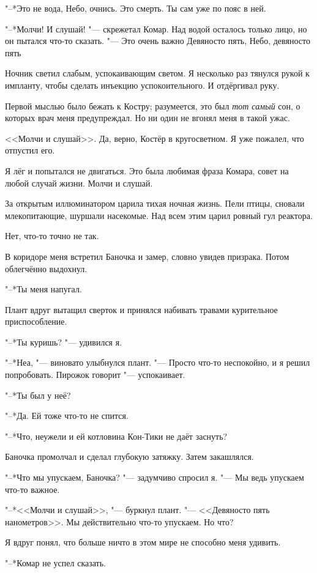 "--*Это не вода, Небо, очнись.
Это смерть.
Ты сам уже по пояс в ней.

"--*Молчи! И слушай! "--- скрежетал Комар.
Над водой осталось только лицо, но он пытался что-то сказать.
"--- Это очень важно\ldotst
Девяносто пять, Небо, девяносто пять\ldotst

\razd

Ночник светил слабым, успокаивающим светом.
Я несколько раз тянулся рукой к импланту, чтобы сделать инъекцию успокоительного.
И отдёргивал руку.

Первой мыслью было бежать к Костру;
разумеется, это был \emph{тот самый} сон, о которых врач меня предупреждал.
Но ни один не вгонял меня в такой ужас.

<<Молчи и слушай>>.
Да, верно, Костёр в кругосветном.
Я уже пожалел, что отпустил его.

Я лёг и попытался не двигаться.
Это была любимая фраза Комара, совет на любой случай жизни.
Молчи и слушай.

За открытым иллюминатором царила тихая ночная жизнь.
Пели птицы, сновали млекопитающие, шуршали насекомые.
Над всем этим царил ровный гул реактора.

Нет, что-то точно не так.

В коридоре меня встретил Баночка и замер, словно увидев призрака.
Потом облегчённо выдохнул.

"--*Ты меня напугал.

Плант вдруг вытащил сверток и принялся набивать травами курительное приспособление.

"--*Ты куришь? "--- удивился я.

"--*Неа, "--- виновато улыбнулся плант.
"--- Просто что-то неспокойно, и я решил попробовать.
Пирожок говорит "--- успокаивает.

"--*Ты был у неё?

"--*Да.
Ей тоже что-то не спится.

"--*Что, неужели и ей котловина Кон-Тики не даёт заснуть?

Баночка промолчал и сделал глубокую затяжку.
Затем закашлялся.

"--*Что мы упускаем, Баночка? "--- задумчиво спросил я.
"--- Мы ведь упускаем что-то важное.

"--*<<Молчи и слушай>>, "--- буркнул плант.
"--- <<Девяносто пять нанометров>>.
Мы действительно что-то упускаем.
Но что?

Я вдруг понял, что больше ничто в этом мире не способно меня удивить.

"--*Комар не успел сказать.

